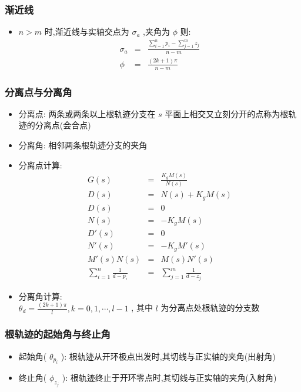 \documentclass{article}
\begin{document}
\begin{frame}
\frametitle{渐近线}
\label{sec-2-1-5}

\begin{itemize}
\item <2-> $n>m$ 时,渐近线与实轴交点为  $\sigma_a$  ,夹角为  $\phi$  则:
       	\begin{eqnarray*}
       	\sigma_a & = &\frac{\sum_{i=1}^n p_i -\sum_{j=1}^m z_j}{n-m} \\
       	\phi &=& \frac{(2k+1)\pi}{n-m}
       	\end{eqnarray*}
\end{itemize}
\end{frame}
\begin{frame}
\frametitle{分离点与分离角}
\label{sec-2-1-6}

\begin{itemize}
\item <2->分离点: 两条或两条以上根轨迹分支在  $s$  平面上相交又立刻分开的点称为根轨迹的分离点(会合点)
\item <3->分离角: 相邻两条根轨迹分支的夹角
\end{itemize}
\begin{itemize}

\item 分离点计算:
\label{sec-2-1-6-1}%
\begin{eqnarray*}
G(s) & = & \frac{K_g M(s)}{N(s)}\\
D(s) &=& N(s)+K_g M(s) \\
D(s) &=& 0 \\
N(s) &=& - K_g M(s) \\
D'(s) &=& 0 \\
N'(s) &=& -K_g M'(s) \\
M'(s)N(s) &=&M(s)N'(s) \\
\sum_{i=1}^n\frac{1}{d-p_i} &=& \sum_{j=1}^m\frac{1}{d-z_j}
\end{eqnarray*}


\item 分离角计算:\\
\label{sec-2-1-6-2}%
$\theta_d = \frac{(2k+1)\pi}{l}, k=0,1,\cdots,l-1$ , 其中  $l$  为分离点处根轨迹的分支数

\end{itemize} %
\end{frame}
\begin{frame}
\frametitle{根轨迹的起始角与终止角}
\label{sec-2-1-7}

\begin{itemize}
\item 起始角( $\theta_{p_i}$ ): 根轨迹从开环极点出发时,其切线与正实轴的夹角(出射角)
\item 终止角( $\phi_{z_j}$ ): 根轨迹终止于开环零点时,其切线与正实轴的夹角(入射角)
\end{itemize}
\end{frame}
\end{document}
